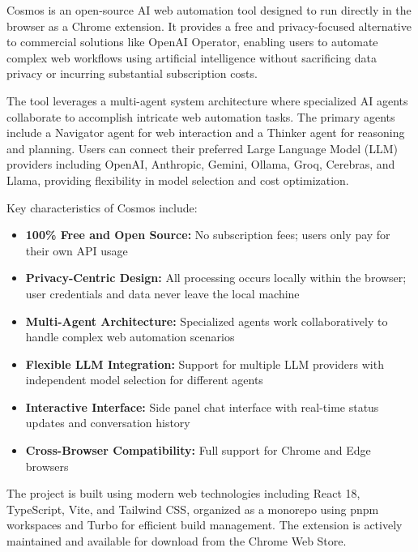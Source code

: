 \documentclass[12pt,a4paper]{article}
\begin{document}
\setlength{\parindent}{0.5in}

Cosmos is an open-source AI web automation tool designed to run directly in the browser as a Chrome extension. It provides a free and privacy-focused alternative to commercial solutions like OpenAI Operator, enabling users to automate complex web workflows using artificial intelligence without sacrificing data privacy or incurring substantial subscription costs.

The tool leverages a multi-agent system architecture where specialized AI agents collaborate to accomplish intricate web automation tasks. The primary agents include a Navigator agent for web interaction and a Thinker agent for reasoning and planning. Users can connect their preferred Large Language Model (LLM) providers including OpenAI, Anthropic, Gemini, Ollama, Groq, Cerebras, and Llama, providing flexibility in model selection and cost optimization.

Key characteristics of Cosmos include:

\begin{itemize}
    \item \textbf{100\% Free and Open Source:} No subscription fees; users only pay for their own API usage
    \item \textbf{Privacy-Centric Design:} All processing occurs locally within the browser; user credentials and data never leave the local machine
    \item \textbf{Multi-Agent Architecture:} Specialized agents work collaboratively to handle complex web automation scenarios
    \item \textbf{Flexible LLM Integration:} Support for multiple LLM providers with independent model selection for different agents
    \item \textbf{Interactive Interface:} Side panel chat interface with real-time status updates and conversation history
    \item \textbf{Cross-Browser Compatibility:} Full support for Chrome and Edge browsers
\end{itemize}

The project is built using modern web technologies including React 18, TypeScript, Vite, and Tailwind CSS, organized as a monorepo using pnpm workspaces and Turbo for efficient build management. The extension is actively maintained and available for download from the Chrome Web Store.

\vspace{0.5cm}
\end{document}

